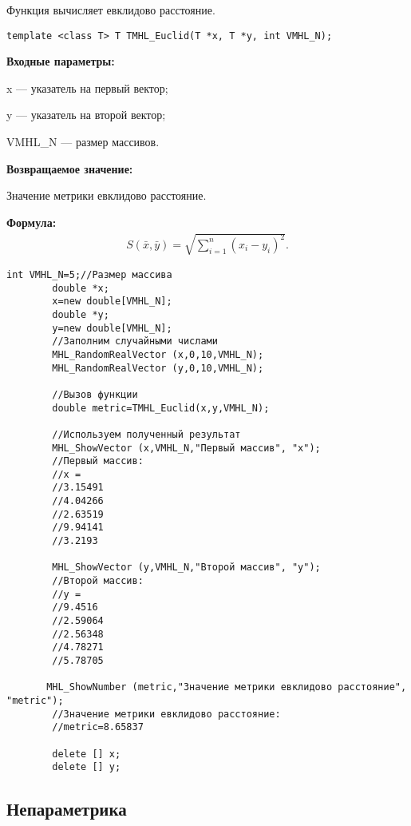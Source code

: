 \documentclass[a4paper,12pt]{article}
\begin{document}
Функция вычисляет евклидово расстояние.


\begin{lstlisting}[label=code_syntax_TMHL_Euclid,caption=Синтаксис]
template <class T> T TMHL_Euclid(T *x, T *y, int VMHL_N);
\end{lstlisting}

\textbf{Входные параметры:}
 
x --- указатель на первый вектор;
 
y --- указатель на второй вектор;
 
VMHL\_N --- размер массивов.

\textbf{Возвращаемое значение:}
 
 Значение метрики евклидово расстояние.

\textbf{Формула:}
\begin{eqnarray*}
S\left( \bar{x}, \bar{y}\right)=\sqrt{\sum_{i=1}^n {\left( x_i-y_i \right)}^2}   .
\end{eqnarray*}


\begin{lstlisting}[label=code_use_TMHL_Euclid,caption=Пример использования]
        int VMHL_N=5;//Размер массива
        double *x;
        x=new double[VMHL_N];
        double *y;
        y=new double[VMHL_N];
        //Заполним случайными числами
        MHL_RandomRealVector (x,0,10,VMHL_N);
        MHL_RandomRealVector (y,0,10,VMHL_N);

        //Вызов функции
        double metric=TMHL_Euclid(x,y,VMHL_N);

        //Используем полученный результат
        MHL_ShowVector (x,VMHL_N,"Первый массив", "x");
        //Первый массив:
        //x =	
        //3.15491
        //4.04266
        //2.63519
        //9.94141
        //3.2193

        MHL_ShowVector (y,VMHL_N,"Второй массив", "y");
        //Второй массив:
        //y =	
        //9.4516
        //2.59064
        //2.56348
        //4.78271
        //5.78705

       MHL_ShowNumber (metric,"Значение метрики евклидово расстояние", "metric");
        //Значение метрики евклидово расстояние:
        //metric=8.65837

        delete [] x;
        delete [] y;
\end{lstlisting}

\subsection{Непараметрика}
\end{document}
